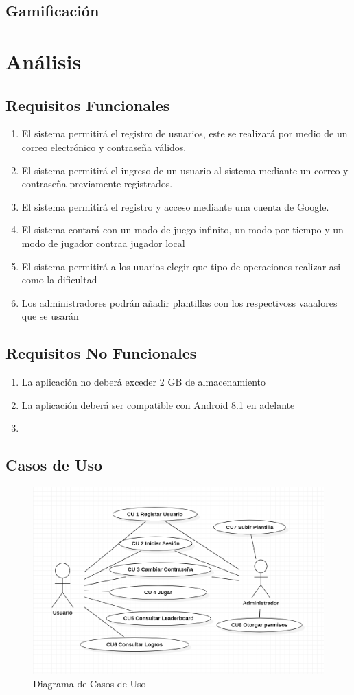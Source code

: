 \documentclass{article}
\begin{document}
\subsection{Gamificación}
\section{Análisis}
\subsection{Requisitos Funcionales}
\begin{enumerate}
\item {El sistema permitirá el registro de usuarios, este se realizará por medio de un correo electrónico y contraseña válidos.}
\item{El sistema permitirá el ingreso de un usuario al sistema mediante un correo y contraseña  previamente registrados.}
\item {El sistema permitirá el registro y acceso mediante una cuenta de Google.}
\item {El sistema contará con un modo de juego infinito, un modo por tiempo y un modo de jugador contraa jugador local}
\item{El sistema permitirá a los uuarios elegir que tipo de operaciones realizar asi como la dificultad}
\item{Los administradores podrán añadir plantillas con los respectivoss vaaalores que se usarán}
\end{enumerate}
\subsection{Requisitos No Funcionales}
\begin{enumerate}
\item {La aplicación no deberá exceder 2 GB de almacenamiento}
\item {La aplicación deberá ser compatible con Android 8.1 en adelante}
\item {}
\end{enumerate}
\subsection{Casos de Uso}
\begin{figure}[H]
    \centering
    \includegraphics[scale=0.7]{imgs/CasosDeUso}
    \caption{Diagrama de Casos de Uso}
\end{figure}
\end{document}
